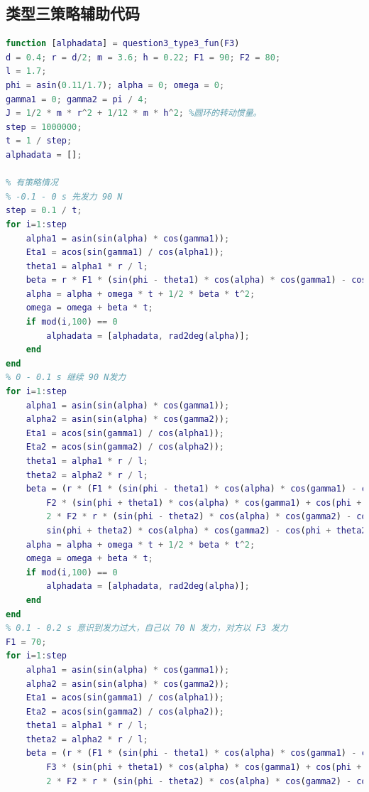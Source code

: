 \documentclass{cumcm}
\begin{document}
\subsection{类型三策略辅助代码}
\begin{lstlisting}[language=matlab]
function [alphadata] = question3_type3_fun(F3)
d = 0.4; r = d/2; m = 3.6; h = 0.22; F1 = 90; F2 = 80;
l = 1.7;
phi = asin(0.11/1.7); alpha = 0; omega = 0;
gamma1 = 0; gamma2 = pi / 4;
J = 1/2 * m * r^2 + 1/12 * m * h^2; %圆环的转动惯量。
step = 1000000;
t = 1 / step;
alphadata = [];

% 有策略情况
% -0.1 - 0 s 先发力 90 N
step = 0.1 / t;
for i=1:step
    alpha1 = asin(sin(alpha) * cos(gamma1));
    Eta1 = acos(sin(gamma1) / cos(alpha1));
    theta1 = alpha1 * r / l;
    beta = r * F1 * (sin(phi - theta1) * cos(alpha) * cos(gamma1) - cos(phi - theta1) * sin(alpha1) * sin(Eta1)) / J;
    alpha = alpha + omega * t + 1/2 * beta * t^2;
    omega = omega + beta * t;
    if mod(i,100) == 0
        alphadata = [alphadata, rad2deg(alpha)];
    end
end
% 0 - 0.1 s 继续 90 N发力
for i=1:step
    alpha1 = asin(sin(alpha) * cos(gamma1));
    alpha2 = asin(sin(alpha) * cos(gamma2));
    Eta1 = acos(sin(gamma1) / cos(alpha1));
    Eta2 = acos(sin(gamma2) / cos(alpha2));
    theta1 = alpha1 * r / l;
    theta2 = alpha2 * r / l;
    beta = (r * (F1 * (sin(phi - theta1) * cos(alpha) * cos(gamma1) - cos(phi - theta1) * sin(alpha1) * sin(Eta1)) - ...
        F2 * (sin(phi + theta1) * cos(alpha) * cos(gamma1) + cos(phi + theta1) * sin(alpha1) * sin(Eta1))) + ...
        2 * F2 * r * (sin(phi - theta2) * cos(alpha) * cos(gamma2) - cos(phi - theta2) * sin(alpha2) * sin(Eta2) - ...
        sin(phi + theta2) * cos(alpha) * cos(gamma2) - cos(phi + theta2) * sin(alpha2) * sin(Eta2))) / J;
    alpha = alpha + omega * t + 1/2 * beta * t^2;
    omega = omega + beta * t;
    if mod(i,100) == 0
        alphadata = [alphadata, rad2deg(alpha)];
    end
end
% 0.1 - 0.2 s 意识到发力过大，自己以 70 N 发力，对方以 F3 发力
F1 = 70;
for i=1:step
    alpha1 = asin(sin(alpha) * cos(gamma1));
    alpha2 = asin(sin(alpha) * cos(gamma2));
    Eta1 = acos(sin(gamma1) / cos(alpha1));
    Eta2 = acos(sin(gamma2) / cos(alpha2));
    theta1 = alpha1 * r / l;
    theta2 = alpha2 * r / l;
    beta = (r * (F1 * (sin(phi - theta1) * cos(alpha) * cos(gamma1) - cos(phi - theta1) * sin(alpha1) * sin(Eta1)) - ...
        F3 * (sin(phi + theta1) * cos(alpha) * cos(gamma1) + cos(phi + theta1) * sin(alpha1) * sin(Eta1))) + ...
        2 * F2 * r * (sin(phi - theta2) * cos(alpha) * cos(gamma2) - cos(phi - theta2) * sin(alpha2) * sin(Eta2) - ...

\end{lstlisting}
\end{document}
